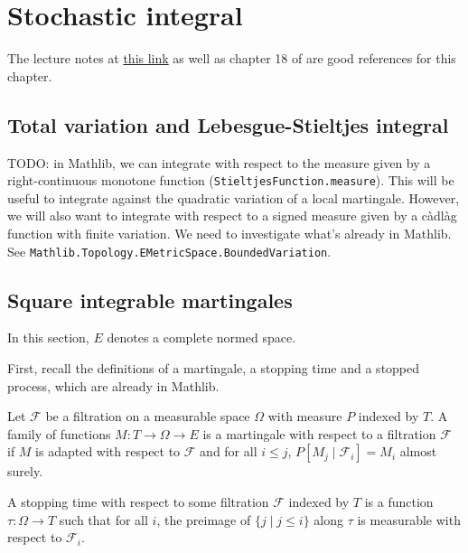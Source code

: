 \chapter{Stochastic integral}

The lecture notes at \href{https://dec41.user.srcf.net/h/III_L/stochastic_calculus_and_applications/}{this link} as well as chapter 18 of \cite{kallenberg2021} are good references for this chapter.

\section{Total variation and Lebesgue-Stieltjes integral}

TODO: in Mathlib, we can integrate with respect to the measure given by a right-continuous monotone function (\texttt{StieltjesFunction.measure}). This will be useful to integrate against the quadratic variation of a local martingale.
However, we will also want to integrate with respect to a signed measure given by a càdlàg function with finite variation.
We need to investigate what's already in Mathlib. See \texttt{Mathlib.Topology.EMetricSpace.BoundedVariation}.



\section{Square integrable martingales}

In this section, $E$ denotes a complete normed space.

First, recall the definitions of a martingale, a stopping time and a stopped process, which are already in Mathlib.


\begin{definition}[Martingale]\label{def:Martingale}
  \mathlibok
Let $\mathcal{F}$ be a filtration on a measurable space $\Omega$ with measure $P$ indexed by $T$.
A family of functions $M : T \to \Omega \to E$ is a martingale with respect to a filtration $\mathcal{F}$ if $M$ is adapted with respect to $\mathcal{F}$ and for all $i \le j$, $P[M_j \mid \mathcal{F}_i] = M_i$ almost surely.
\end{definition}


\begin{definition}\label{def:IsStoppingTime}
  \mathlibok
A stopping time with respect to some filtration $\mathcal{F}$ indexed by $T$ is a function $\tau : \Omega \to T$ such that for all $i$, the preimage of $\{j \mid j \le i\}$ along $\tau$ is measurable with respect to $\mathcal{F}_i$.
\end{definition}



